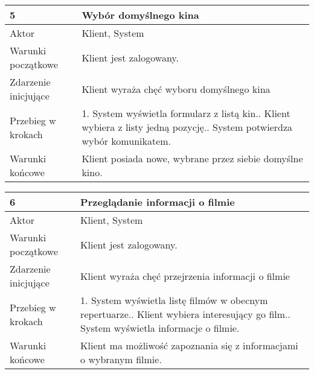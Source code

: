 \newpage
\begin{tabularx}{\textwidth}{|l|X|}
\hline
5                      & Wybór domyślnego kina                                                                                                                                                       \\ \hline
Aktor                  & Klient, System \\ \hline
Warunki początkowe     & Klient jest zalogowany.                                                                                                                                                     \\ \hline
Zdarzenie inicjujące   & Klient wyraża chęć wyboru domyślnego kina                                                                                                                                   \\ \hline
Przebieg w krokach     & 1. System wyświetla formularz z listą kin.\newline 2. Klient wybiera z listy jedną pozycję.\newline 3. System potwierdza wybór komunikatem. \\ \hline
Warunki końcowe        & Klient posiada nowe, wybrane przez siebie domyślne kino.                                                                                                                    \\ \hline
\end{tabularx}
\par
\begin{tabularx}{\textwidth}{|l|X|}
\hline
6                      & Przeglądanie informacji o filmie                                                                                                                                                     \\ \hline
Aktor                  & Klient, System \\ \hline
Warunki początkowe     & Klient jest zalogowany.                                                                                                                                                              \\ \hline
Zdarzenie inicjujące   & Klient wyraża chęć przejrzenia informacji o filmie                                                                                                                                   \\ \hline
Przebieg w krokach     & 1. System wyświetla listę filmów w obecnym repertuarze.\newline 2. Klient wybiera interesujący go film.\newline 3. System wyświetla informacje o filmie. \\ \hline
Warunki końcowe        & Klient ma możliwość zapoznania się z informacjami o wybranym filmie.                                                                                                                 \\ \hline
\end{tabularx}
